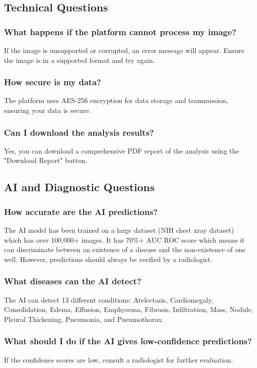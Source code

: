 \documentclass[12pt]{article}
\begin{document}
\subsection{Technical Questions}
\subsubsection{What happens if the platform cannot process my image?}
If the image is unsupported or corrupted, an error message will appear. Ensure the image is in a supported format and try again.

\subsubsection{How secure is my data?}
The platform uses AES-256 encryption for data storage and transmission, ensuring your data is secure.

\subsubsection{Can I download the analysis results?}
Yes, you can download a comprehensive PDF report of the analysis using the "Download Report" button.

\subsection{AI and Diagnostic Questions}
\subsubsection{How accurate are the AI predictions?}
The AI model has been trained on a large dataset (NIH chest xray dataset) which has over 100,000+ images. It has 70\%+ AUC ROC score which means it can discriminate between an existence of a disease and the non-existence of one well. However, predictions should always be verified by a radiologist.

\subsubsection{What diseases can the AI detect?}
The AI can detect 13 different conditions: Atelectasis, Cardiomegaly, Consolidation, Edema,
Effusion, Emphysema, Fibrosis, Infiltration, Mass, Nodule, Pleural Thickening, Pneumonia, and Pneumothorax.

\subsubsection{What should I do if the AI gives low-confidence predictions?}
If the confidence scores are low, consult a radiologist for further evaluation.
\end{document}
